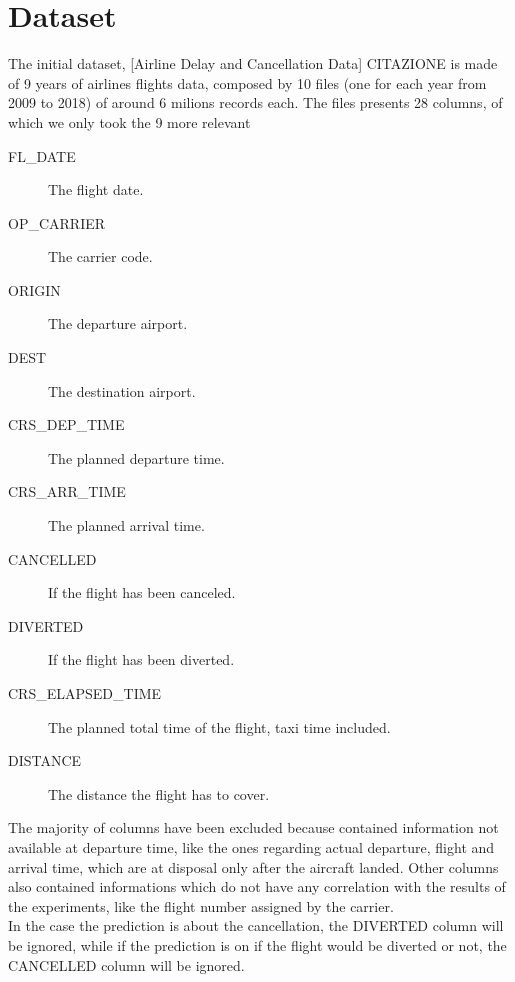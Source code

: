 \documentclass[
	letterpaper, %
	10pt, %
]{class}
\begin{document}

\section{Dataset}

The initial dataset, [Airline Delay and Cancellation Data] CITAZIONE is made of 9 years of airlines flights data, composed by 10 files (one for each year from 2009 to 2018) of around 6 milions records each.
The files presents 28 columns, of which we only took the 9 more relevant\\

\begin{description}
	\item[FL\_DATE] The flight date.
	\item[OP\_CARRIER] The carrier code.
	\item[ORIGIN] The departure airport.
	\item[DEST] The destination airport.
	\item[CRS\_DEP\_TIME] The planned departure time.
	\item[CRS\_ARR\_TIME] The planned arrival time.
	\item[CANCELLED] If the flight has been canceled.
	\item[DIVERTED] If the flight has been diverted.
	\item[CRS\_ELAPSED\_TIME] The planned total time of the flight, taxi time included.
	\item[DISTANCE] The distance the flight has to cover.\\
\end{description}

The majority of columns have been excluded because contained information not available at departure time, like the ones regarding actual departure, flight and arrival time, which are at disposal only after the aircraft landed.
Other columns also contained informations which do not have any correlation with the results of the experiments, like the flight number assigned by the carrier.\\

In the case the prediction is about the cancellation, the DIVERTED column will be ignored, while if the prediction is on if the flight would be diverted or not, the CANCELLED column will be ignored.\\
\end{document}

